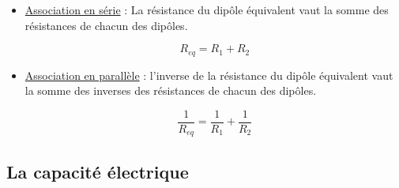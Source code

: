 \begin{itemize}
\item \underline{Association en série} : La résistance du dipôle équivalent vaut la somme des résistances de chacun des dipôles. \\

\begin{center}
\begin{minipage}{.2\textwidth}
\begin{center}

\end{center}
\end{minipage}
\hspace{1cm}
\begin{minipage}{.3\textwidth} 
\begin{equation}
	R_{eq} = R_1 + R_2
\end{equation}
\end{minipage}
\end{center}

\vspace{0.5cm}

\item \underline{Association en parallèle} : l'inverse de la résistance du dipôle équivalent vaut la somme des inverses des résistances de chacun des dipôles. \\

\begin{center}
\begin{minipage}{.2\textwidth}
\begin{center}
	
\end{center}
\end{minipage}
\hspace{1cm}
\begin{minipage}{.3\textwidth} 
\begin{equation}
	\dfrac{1}{R_{eq}} = \dfrac{1}{R_1} + \dfrac{1}{R_2} 
\end{equation}
\end{minipage}
\end{center}
\end{itemize}

\subsection{ La capacité électrique }

